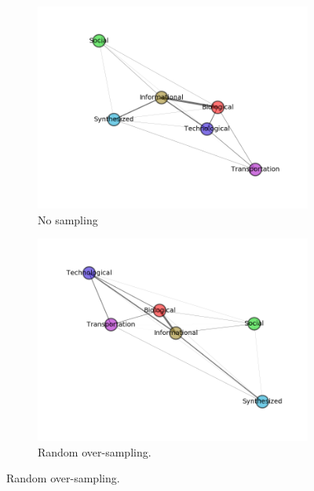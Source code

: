 \documentclass{article}
\begin{document}
\begin{figure}[H]
\begin{subfigure}{0.48\textwidth}
\includegraphics[width=\linewidth]{figs/similarity/Domain/None/g.png}
\caption{No sampling} \label{no_graph}
\end{subfigure}\hspace*{\fill}
\begin{subfigure}{0.48\textwidth}
\includegraphics[width=\linewidth]{figs/similarity/Domain/RandomOver/g.png}
\caption{Random over-sampling.} \label{random_over_graph}
\end{subfigure}


\end{figure}
\end{document}
